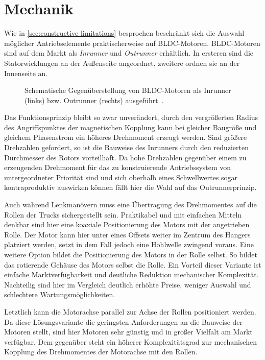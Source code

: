 \chapter{Mechanik}
	Wie in \cref{sec:constructive limitations} besprochen beschränkt sich die Auswahl möglicher Antriebselemente praktischerweise auf BLDC-Motoren.
	BLDC-Motoren sind auf dem Markt als \textit{Inrunner} und \textit{Outrunner} erhältlich.
	In ersteren sind die Statorwicklungen an der Außenseite angeordnet, zweitere ordnen sie an der Innenseite an.
	\begin{figure}[h]
		\centering
		
		\caption[Gegenüberstellung von Inrunner und Outrunner]{Schematische Gegenüberstellung von BLDC-Motoren als Inrunner (links) bzw. Outrunner (rechts) ausgeführt~\cite{inrunner.outrunner.2022}.}
		\label{fig:inrunner outrunner}
	\end{figure}
	Das Funktionsprinzip bleibt so zwar unverändert, durch den vergrößerten Radius des Angriffspunktes der magnetischen Kopplung kann bei gleicher Baugröße und gleichem Phasenstrom ein höheres Drehmoment erzeugt werden.
	Sind größere Drehzahlen gefordert, so ist die Bauweise des Inrunners durch den reduzierten Durchmesser des Rotors vorteilhaft.
	Da hohe Drehzahlen gegenüber einem zu erzeugenden Drehmoment für das zu konstruierende Antriebssystem von untergeordneter Priorität sind und sich oberhalb eines Schwellwertes sogar kontraproduktiv auswirken können fällt hier die Wahl auf das Outrunnerprinzip.\par\medskip
	Auch während Lenkmanövern muss eine Übertragung des Drehmomentes auf die Rollen der Trucks sichergestellt sein.
	Praktikabel und mit einfachen Mitteln denkbar sind hier eine koaxiale Positionierung des Motors mit der angetrieben Rolle.
	Der Motor kann hier unter eines Offsets weiter im Zentrum des Hangers platziert werden, setzt in dem Fall jedoch eine Hohlwelle zwingend voraus.
	Eine weitere Option bildet die Positionierung des Motors in der Rolle selbst.
	So bildet das rotierende Gehäuse des Motors selbst die Rolle.
	Ein Vorteil dieser Variante ist einfache Marktverfügbarkeit und deutliche Reduktion mechanischer Komplexität.
	Nachteilig sind hier im Vergleich deutlich erhöhte Preise, weniger Auswahl und schlechtere Wartungsmöglichkeiten.\par
	Letztlich kann die Motorachse parallel zur Achse der Rollen positioniert werden.
	Da diese Lösungsvariante die geringsten Anforderungen an die Bauweise der Motoren stellt, sind hier Motoren sehr günstig und in großer Vielfalt am Markt verfügbar.
	Dem gegenüber steht ein höherer Komplexitätsgrad zur mechanischen Kopplung des Drehmomentes der Motorachse mit den Rollen.
